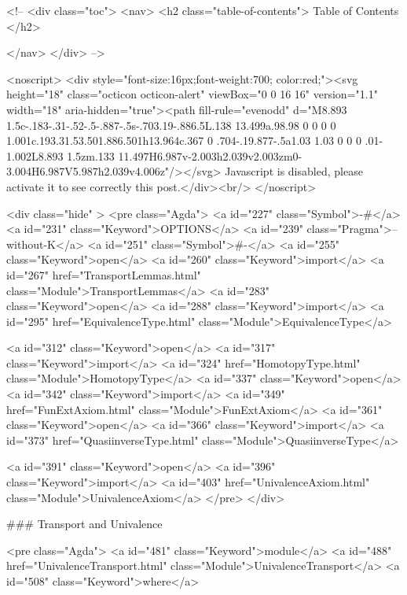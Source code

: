   <!-- 
  <div class="toc">
    <nav>
    <h2 class="table-of-contents"> Table of Contents </h2>
      

    </nav>
  </div>
   -->

  <noscript>
  <div style="font-size:16px;font-weight:700; color:red;"><svg height="18" class="octicon octicon-alert" viewBox="0 0 16 16" version="1.1" width="18" aria-hidden="true"><path fill-rule="evenodd" d="M8.893 1.5c-.183-.31-.52-.5-.887-.5s-.703.19-.886.5L.138 13.499a.98.98 0 0 0 0 1.001c.193.31.53.501.886.501h13.964c.367 0 .704-.19.877-.5a1.03 1.03 0 0 0 .01-1.002L8.893 1.5zm.133 11.497H6.987v-2.003h2.039v2.003zm0-3.004H6.987V5.987h2.039v4.006z"/></svg> Javascript is disabled, please activate it to see correctly this post.</div><br/>
  </noscript>

  <div class="hide" >
<pre class="Agda">
<a id="227" class="Symbol">{-#</a> <a id="231" class="Keyword">OPTIONS</a> <a id="239" class="Pragma">--without-K</a> <a id="251" class="Symbol">#-}</a>
<a id="255" class="Keyword">open</a> <a id="260" class="Keyword">import</a> <a id="267" href="TransportLemmas.html" class="Module">TransportLemmas</a>
<a id="283" class="Keyword">open</a> <a id="288" class="Keyword">import</a> <a id="295" href="EquivalenceType.html" class="Module">EquivalenceType</a>

<a id="312" class="Keyword">open</a> <a id="317" class="Keyword">import</a> <a id="324" href="HomotopyType.html" class="Module">HomotopyType</a>
<a id="337" class="Keyword">open</a> <a id="342" class="Keyword">import</a> <a id="349" href="FunExtAxiom.html" class="Module">FunExtAxiom</a>
<a id="361" class="Keyword">open</a> <a id="366" class="Keyword">import</a> <a id="373" href="QuasiinverseType.html" class="Module">QuasiinverseType</a>

<a id="391" class="Keyword">open</a> <a id="396" class="Keyword">import</a> <a id="403" href="UnivalenceAxiom.html" class="Module">UnivalenceAxiom</a>
</pre>
</div>

### Transport and Univalence

<pre class="Agda">
<a id="481" class="Keyword">module</a> <a id="488" href="UnivalenceTransport.html" class="Module">UnivalenceTransport</a> <a id="508" class="Keyword">where</a>

